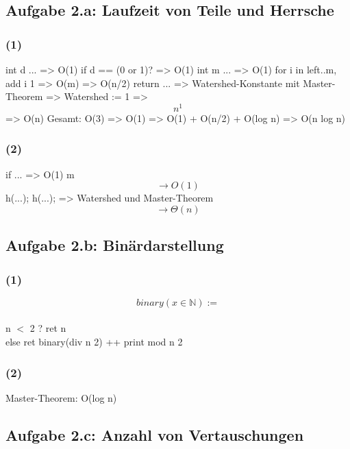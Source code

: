 \documentclass[a4paper,12pt]{article}
\begin{document}
\subsection*{Aufgabe 2.a: Laufzeit von Teile und Herrsche}
\subsubsection*{(1)}
int d ... => O(1)
if d == (0 or 1)? => O(1)
int m ... => O(1)
for i in left..m, add i 1 => O(m) => O(n/2)
return ... => Watershed-Konstante mit Master-Theorem => Watershed := 1 => $$n^1$$ => O(n)
Gesamt: O(3) => O(1) => O(1) + O(n/2) + O(log n) => O(n log n)
\subsubsection*{(2)}
if ... => O(1)
m $$\rightarrow O(1)$$
h(...);
h(...);
=> Watershed und Master-Theorem $$\rightarrow \Theta(n)$$
\subsection*{Aufgabe 2.b: Binärdarstellung}
\subsubsection*{(1)}
$$binary(x\in \mathbb{N}) := $$\\
n $<$ 2 ? ret n\\
else ret binary(div n 2) ++ print mod n 2
\subsubsection*{(2)}
Master-Theorem: O(log n)
\subsection*{Aufgabe 2.c: Anzahl von Vertauschungen}
\end{document}

